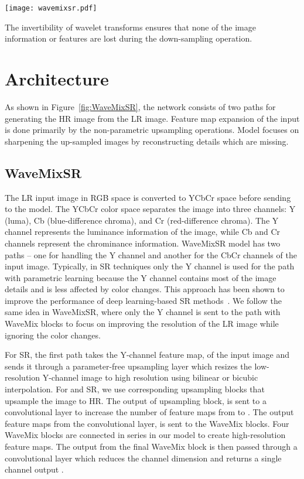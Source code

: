 \documentclass{article}
\begin{document}
\begin{figure*}[ht]

\centering
\texttt{[image: wavemixsr.pdf]}
\caption{Architecture of WaveMixSR along with the details of the WaveMix block. Architecture is shown for  super-resolution. For   and  super-resolution, we only modify the upsample blocks in the architecture keeping the other blocks intact.}
\label{fig:WaveMixSR}

\end{figure*}
The invertibility of wavelet transforms ensures that none of the image information or features are lost during the down-sampling operation.

\section{Architecture}

As shown in Figure~\ref{fig:WaveMixSR}, the network consists of two paths for generating the HR image from the LR image. Feature map expansion of the input is done primarily by the non-parametric upsampling operations. Model focuses on sharpening the up-sampled images by reconstructing details which are missing. 

\subsection{WaveMixSR}


The LR input image in RGB space is converted to YCbCr space before sending to the model. The YCbCr color space separates the image into three channels: Y (luma), Cb (blue-difference chroma), and Cr (red-difference chroma). The Y channel represents the luminance information of the image, while Cb and Cr channels represent the chrominance information. WaveMixSR model has two paths -- one for handling the Y channel and another for the CbCr channels of the input image. Typically, in SR techniques only the Y channel is used for the path with parametric learning because the Y channel contains most of the image details and is less affected by color changes. This approach has been shown to improve the performance of deep learning-based SR methods~\cite{dong2015image}. We follow the same idea in WaveMixSR, where only the Y channel is sent to the path with WaveMix blocks to focus on improving the resolution of the LR image while ignoring the color changes.

For  SR, the first path takes the Y-channel feature map,  of the input image and sends it through a parameter-free upsampling layer which resizes the low-resolution Y-channel image to high resolution using bilinear or bicubic interpolation. For  and  SR, we use corresponding upsampling blocks that upsample the image to HR. The output of upsampling block,  is sent to a convolutional layer to increase the number of feature maps from  to . The output feature maps from the convolutional layer,  is sent to the WaveMix blocks. Four WaveMix blocks are connected in series in our model to create high-resolution feature maps. The output  from the final WaveMix block is then passed through a convolutional layer which reduces the channel dimension  and returns a single channel output . 
\end{document}
